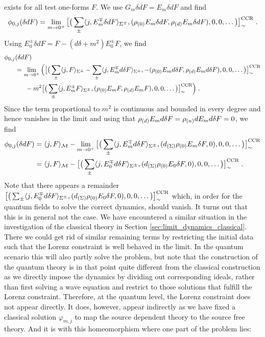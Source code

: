 exists for all test one-forms $F$. We use $G_m \delta d F = E_m \delta d F$ and find
\begin{align}
\phi_{0,j} (\delta d F) = \lim\limits_{m \to 0^+} \big[\big( \sum_{\pm}\langle j , E_m^\mp \delta d F \rangle_{\Sigma^\pm} , (\rho_{(0)} E_m \delta d F, \rho_{(d)} E_m \delta d F) , 0 , 0, \dots\big)\big]^\text{CCR}_\sim \;.
\end{align}
Using $E^\pm_0 \delta d F = F - (d \delta + m^2) E^\pm_0 F$, we find
\begin{align}
\phi_{0,j} &(\delta d F) \notag \\
&= \lim\limits_{m \to 0^+}\Big(  \big[\big( \sum_{\pm}\langle j ,  F \rangle_{\Sigma^\pm} - \sum_{\pm}\langle j , E_m^\mp d\delta  F \rangle_{\Sigma^\pm} ,- (\rho_{(0)} E_m d \delta F, \rho_{(d)} E_m d \delta F) , 0 , 0, \dots\big)\big]^\text{CCR}_\sim \notag \\
&\phantom{=I} - m^2 \big[\big( \sum_{\pm}\langle j ,  E_m^\mp F \rangle_{\Sigma^\pm}  , (\rho_{(0)} E_m  F, \rho_{(d)} E_m  F) , 0 , 0, \dots\big)\big]^\text{CCR}_\sim\Big) \;.
\end{align}
Since the term proportional to $m^2$ is continuous and bounded in every degree and hence vanishes in the limit and using that $\rho_{(d)} E_m d \delta F = \rho_{(n)} d E_m d \delta F =0$, we find
\begin{align}\label{eqn:zero-mass-limit-field-temp}
\phi_{0,j} (\delta d F)
&= \langle j ,  F \rangle_{\mathcal{M}} - \lim\limits_{m \to 0^+}\big[ \big(  \sum_{\pm}\langle j , E_m^\mp d\delta  F \rangle_{\Sigma^\pm} , (d_{(\Sigma)} \rho_{(0)} E_m  \delta F, 0) , 0 , 0, \dots\big)\big]^\text{CCR}_\sim \notag\\
&= \langle j ,  F \rangle_{\mathcal{M}} - \big[ \big(  \sum_{\pm}\langle j , E_0^\mp d\delta  F \rangle_{\Sigma^\pm} , (d_{(\Sigma)} \rho_{(0)} E_0  \delta F, 0) , 0 , 0, \dots\big)\big]^\text{CCR}_\sim  \;.
\end{align}
Note that there appears a remainder $\big[ \big(  \sum_{\pm}\langle j , E_0^\mp d\delta  F \rangle_{\Sigma^\pm} , (d_{(\Sigma)} \rho_{(0)} E_0  \delta F, 0) , 0 , 0, \dots\big)\big]^\text{CCR}_\sim$ which, in order for the quantum fields to solve the correct dynamics, should vanish. It turns out that this is in general not the case. We have encountered a similar situation in the investigation of the classical theory in Section \ref{sec:limit_dynamics_classical}. There we could get rid of similar remaining terms by restricting the initial data such that the Lorenz constraint is well behaved in the limit.
In the quantum scenario this will also partly solve the problem, but note that the construction of the quantum theory is in that point quite different from the classical construction as we directly impose the dynamics by dividing out corresponding ideals, rather than first solving a wave equation and restrict to those solutions that fulfill the Lorenz constraint. Therefore, at the quantum level, the Lorenz constraint does not appear directly. It does, however, appear indirectly as we have fixed a classical solution $\varphi_{m,j}$ to map the source dependent theory to the source free theory. And it is with this homeomorphism where one part of the problem lies: \\
